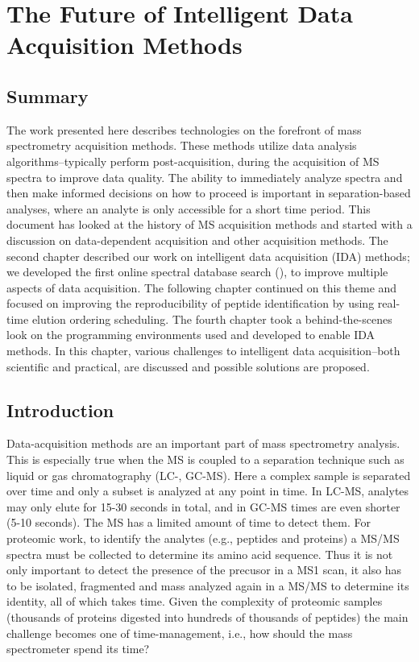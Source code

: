 \chapter{The Future of Intelligent Data Acquisition Methods}

\section{Summary}
The work presented here describes technologies on the forefront of mass spectrometry acquisition methods. These methods utilize data analysis algorithms--typically perform post-acquisition, during the acquisition of MS spectra to improve data quality. The ability to immediately analyze spectra and then make informed decisions on how to proceed is important in separation-based analyses, where an analyte is only accessible for a short time period. This document has looked at the history of MS acquisition methods and started with a discussion on data-dependent acquisition and other acquisition methods. The second chapter described our work on intelligent data acquisition (IDA) methods; we developed the first online spectral database search (\inseq{}), to improve multiple aspects of data acquisition. The following chapter continued on this theme and focused on improving the reproducibility of peptide identification by using real-time elution ordering scheduling. The fourth chapter took a behind-the-scenes look on the programming environments used and developed to enable IDA methods. In this chapter, various challenges to intelligent data acquisition--both scientific and practical, are discussed and possible solutions are proposed.

\section{Introduction}
Data-acquisition methods are an important part of mass spectrometry analysis. This is especially true when the MS is coupled to a separation technique such as liquid or gas chromatography (LC-, GC-MS). Here a complex sample is separated over time and only a subset is analyzed at any point in time. In LC-MS, analytes may only elute for 15-30 seconds in total, and in GC-MS times are even shorter (5-10 seconds). The MS has a limited amount of time to detect them. For proteomic work, to identify the analytes (e.g., peptides and proteins) a MS/MS spectra must be collected to determine its amino acid sequence. Thus it is not only important to detect the presence of the precusor in a MS1 scan, it also has to be isolated, fragmented and mass analyzed again in a MS/MS to determine its identity, all of which takes time. Given the complexity of proteomic samples (thousands of proteins digested into hundreds of thousands of peptides) the main challenge becomes one of time-management, i.e., how should the mass spectrometer spend its time?

